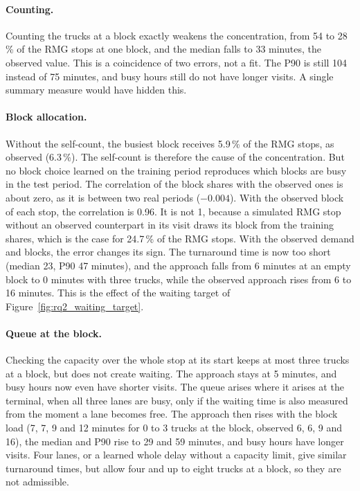 



\paragraph{Counting.} Counting the trucks at a block exactly weakens the
concentration, from 54 to 28\,\% of the RMG stops at one block, and the median falls
to 33 minutes, the observed value. This is a coincidence of two errors, not a fit.
The P90 is still 104 instead of 75 minutes, and busy hours still do not have longer
visits. A single summary measure would have hidden this.

\paragraph{Block allocation.} Without the self-count, the busiest block receives
5.9\,\% of the RMG stops, as observed (6.3\,\%). The self-count is therefore the
cause of the concentration. But no block choice learned on the training period
reproduces which blocks are busy in the test period. The correlation of the block
shares with the observed ones is about zero, as it is between two real periods
($-0.004$). With the observed block of each stop, the correlation is 0.96. It is not
1, because a simulated RMG stop without an observed counterpart in its visit draws its
block from the training shares, which is the case for 24.7\,\% of the RMG stops. With
the observed demand and blocks, the error changes its sign. The turnaround time is
now too short (median 23, P90 47 minutes), and the approach falls from 6 minutes at an
empty block to 0 minutes with three trucks, while the observed approach rises from 6
to 16 minutes. This is the effect of the waiting target of
Figure~\ref{fig:rq2_waiting_target}.

\paragraph{Queue at the block.} Checking the capacity over the whole stop at its
start keeps at most three trucks at a block, but does not create waiting. The
approach stays at 5 minutes, and busy hours now even have shorter visits. The queue
arises where it arises at the terminal, when all three lanes are
busy, only if the waiting time is also measured from the moment a lane becomes free.
The approach then rises with the block load (7, 7, 9 and 12 minutes for 0 to 3 trucks
at the block, observed 6, 6, 9 and 16), the median and P90 rise to 29 and 59 minutes,
and busy hours have longer visits. Four lanes, or a learned whole
delay without a capacity limit, give similar turnaround times, but allow four and up
to eight trucks at a block, so they are not admissible.


